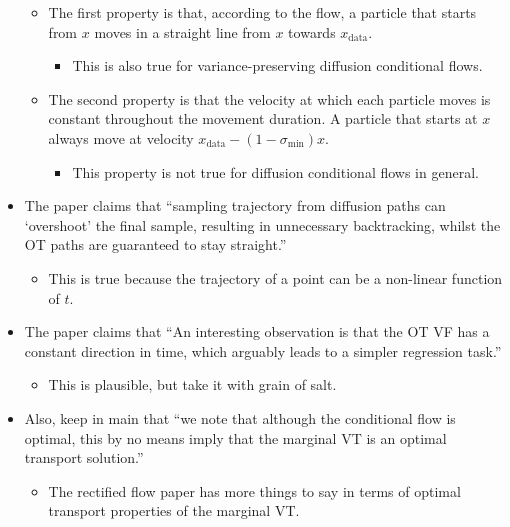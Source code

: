 \documentclass[10pt]{article}
\newcommand{\data}{\mathrm{data}}
\begin{document}
\begin{itemize}
\begin{itemize}
    \item The first property is that, according to the flow, a particle that starts from $x$ moves in a straight line from $x$ towards $x_{\data}$.
    \begin{itemize}
      \item This is also true for variance-preserving diffusion conditional flows.
    \end{itemize}

    \item The second property is that the velocity at which each particle moves is constant throughout the movement duration. A particle that starts at $x$ always move at velocity $x_{\data} - (1-\sigma_{\min}) x$.
    \begin{itemize}
      \item This property is not true for diffusion conditional flows in general.
    \end{itemize}
  \end{itemize}
  
  \item The paper claims that ``sampling trajectory from diffusion paths can `overshoot' the final sample, resulting in unnecessary backtracking, whilst the OT paths are guaranteed to stay straight.''
  \begin{itemize}
    \item This is true because the trajectory of a point can be a non-linear function of $t$.        
  \end{itemize}

  \item The paper claims that ``An interesting observation is that the OT VF has a constant direction in time, which arguably leads to a simpler regression task.''
  \begin{itemize}
    \item This is plausible, but take it with grain of salt.
  \end{itemize}

  \item Also, keep in main that ``we note that although the conditional flow is optimal, this by no means imply that the marginal VT is an optimal transport solution.''
  \begin{itemize}
    \item The rectified flow paper \cite{Liu:2022} has more things to say in terms of optimal transport properties of the marginal VT.
  \end{itemize}
\end{itemize}
\end{document}
